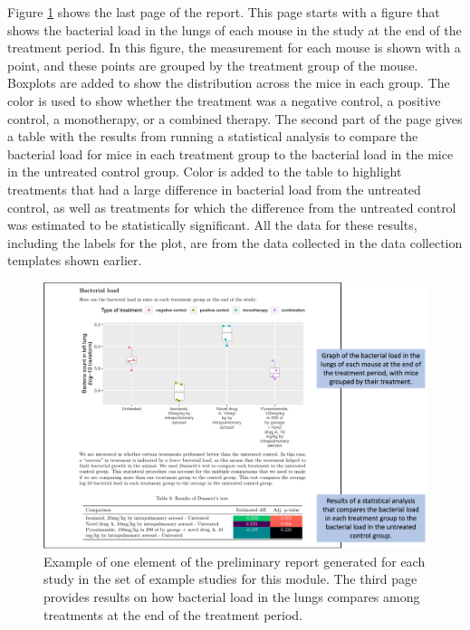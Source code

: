 \documentclass[]{tufte-book}
\begin{document}
Figure \ref{fig:bactcompare} shows the last page of the report. This page
starts with a figure that shows the bacterial load in the lungs of each mouse in
the study at the end of the treatment period. In this figure, the measurement
for each mouse is shown with a point, and these points are grouped by the
treatment group of the mouse. Boxplots are added to show the distribution across
the mice in each group. The color is used to show whether the treatment was a
negative control, a positive control, a monotherapy, or a combined therapy. The
second part of the page gives a table with the results from running a
statistical analysis to compare the bacterial load for mice in each treatment
group to the bacterial load in the mice in the untreated control group. Color is
added to the table to highlight treatments that had a large difference in
bacterial load from the untreated control, as well as treatments for which the
difference from the untreated control was estimated to be statistically
significant. All the data for these results, including the labels for the plot,
are from the data collected in the data collection templates shown earlier.

\begin{figure}
\includegraphics[width=\textwidth]{figures/project_bact_compare_plot} \caption[Example of one element of the preliminary report generated for each study in the set of example studies for this module]{Example of one element of the preliminary report generated for each study in the set of example studies for this module. The third page provides results on how bacterial load in the lungs compares among treatments at the end of the treatment period.}\label{fig:bactcompare}
\end{figure}
\end{document}
